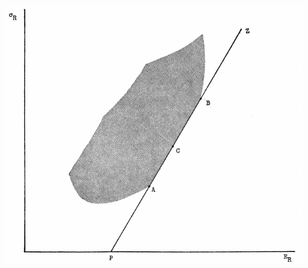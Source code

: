 \documentclass{beamer}
\begin{document}
\begin{frame}[t,fragile]
	\frametitle{\subsecname}
	\includegraphics[width= 0.75 \linewidth, page = 1]{IMAGES/1/6}
\end{frame}





\end{document}
